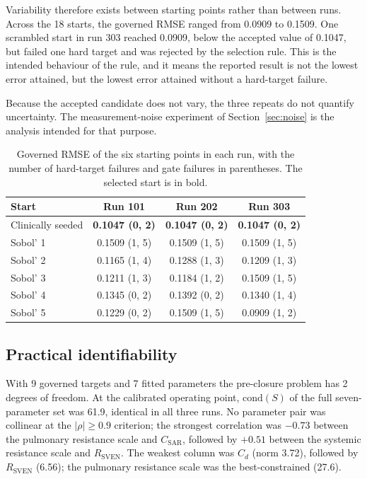 Variability therefore exists between starting points rather than between runs. Across the 18 starts, the governed RMSE ranged from 0.0909 to 0.1509. One scrambled start in run 303 reached 0.0909, below the accepted value of 0.1047, but failed one hard target and was rejected by the selection rule. This is the intended behaviour of the rule, and it means the reported result is not the lowest error attained, but the lowest error attained without a hard-target failure.

Because the accepted candidate does not vary, the three repeats do not quantify uncertainty. The measurement-noise experiment of Section~\ref{sec:noise} is the analysis intended for that purpose.

\begin{table}[ht]
\centering\small
\caption{Governed RMSE of the six starting points in each run, with the number of hard-target failures and gate failures in parentheses. The selected start is in bold.}
\label{tab:multistart}
\begin{tabular}{lccc}
\toprule
\textbf{Start} & \textbf{Run 101} & \textbf{Run 202} & \textbf{Run 303} \\
\midrule
Clinically seeded & \textbf{0.1047 (0, 2)} & \textbf{0.1047 (0, 2)} & \textbf{0.1047 (0, 2)} \\
Sobol' 1 & 0.1509 (1, 5) & 0.1509 (1, 5) & 0.1509 (1, 5) \\
Sobol' 2 & 0.1165 (1, 4) & 0.1288 (1, 3) & 0.1209 (1, 3) \\
Sobol' 3 & 0.1211 (1, 3) & 0.1184 (1, 2) & 0.1509 (1, 5) \\
Sobol' 4 & 0.1345 (0, 2) & 0.1392 (0, 2) & 0.1340 (1, 4) \\
Sobol' 5 & 0.1229 (0, 2) & 0.1509 (1, 5) & 0.0909 (1, 2) \\
\bottomrule
\end{tabular}
\end{table}

\subsection{Practical identifiability}
\label{sec:results_identifiability}
With 9 governed targets and 7 fitted parameters the pre-closure problem has 2 degrees of freedom. At the calibrated operating point, $\mathrm{cond}(S)$ of the full seven-parameter set was 61.9, identical in all three runs. No parameter pair was collinear at the $\lvert\rho\rvert \ge 0.9$ criterion; the strongest correlation was $-0.73$ between the pulmonary resistance scale and $C_{\mathrm{SAR}}$, followed by $+0.51$ between the systemic resistance scale and $R_{\mathrm{SVEN}}$. The weakest column was $C_d$ (norm 3.72), followed by $R_{\mathrm{SVEN}}$ (6.56); the pulmonary resistance scale was the best-constrained (27.6).

